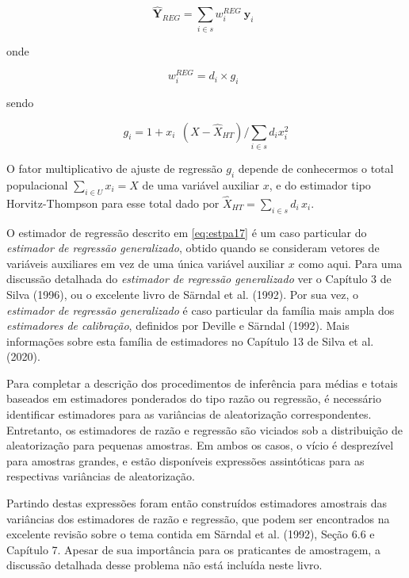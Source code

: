 \documentclass[
  12pt,
  brazilian,
]{book}
\theoremstyle{definition}
\theoremstyle{definition}
\theoremstyle{definition}
\theoremstyle{definition}
\theoremstyle{remark}
\begin{document}
\begin{equation}
\mathbf{\widehat{Y}}_{REG} = \sum_{i \in s} {w_i^{REG} \ } \mathbf{y}_i \,\,\,  \label{eq:estpa17}
\end{equation}

onde

\begin{equation}
w_i^{REG} = d_i \times g_i \,\,\, \label{eq:estpa18}
\end{equation}

sendo

\[
g_{i} = 1 + x_{i \mbox{ }} (X - \widehat{X}_{HT}) / \sum_{i \in s} d_i x_i^2
\]

O fator multiplicativo de ajuste de regressão \(g_i\) depende de conhecermos o total populacional \(\sum_{i \in U} x_i = X\) de uma variável auxiliar \(x\), e do estimador tipo Horvitz-Thompson para esse total dado por \(\widehat{X}_{HT} = \sum_{i \in s} d_i \, x_i\).

O estimador de regressão descrito em \eqref{eq:estpa17} é um caso particular do \emph{estimador de regressão generalizado}, obtido quando se consideram vetores de variáveis auxiliares em vez de uma única variável auxiliar \(x\) como aqui. Para uma discussão detalhada do \emph{estimador de regressão generalizado} ver o Capítulo 3 de Silva (1996), ou o excelente livro de Särndal et al. (1992). Por sua vez, o \emph{estimador de regressão generalizado} é caso particular da família mais ampla dos \emph{estimadores de calibração}, definidos por Deville e Särndal (1992). Mais informações sobre esta família de estimadores no Capítulo 13 de Silva et al. (2020).

Para completar a descrição dos procedimentos de inferência para médias e totais baseados em estimadores ponderados do tipo razão ou regressão, é necessário identificar estimadores para as variâncias de aleatorização correspondentes. Entretanto, os estimadores de razão e regressão são viciados sob a distribuição de aleatorização para pequenas amostras. Em ambos os casos, o vício é desprezível para amostras grandes, e estão disponíveis expressões assintóticas para as respectivas variâncias de aleatorização.

Partindo destas expressões foram então construídos estimadores amostrais das variâncias dos estimadores de razão e regressão, que podem ser encontrados na excelente revisão sobre o tema contida em Särndal et al. (1992), Seção 6.6 e Capítulo 7. Apesar de sua importância para os praticantes de amostragem, a discussão detalhada desse problema não está incluída neste livro.
\end{document}
